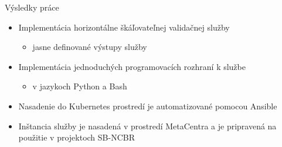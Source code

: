 \documentclass[
  aspectratio=169,
]{beamer}
\begin{document}
%

\begin{frame}{Výsledky práce}
\begin{itemize}
  \item Implementácia horizontálne škáľovateľnej validačnej služby
  \begin{itemize}
    \item jasne definované výstupy služby
  \end{itemize}

  \item Implementácia jednoduchých programovacích rozhraní k službe
  \begin{itemize}
    \item v jazykoch Python a Bash
  \end{itemize}

  \item Nasadenie do Kubernetes prostredí je automatizované pomocou Ansible
  \item Inštancia služby je nasadená v prostredí MetaCentra a je pripravená na použitie v projektoch SB-NCBR
\end{itemize}
\end{frame}
\end{document}
